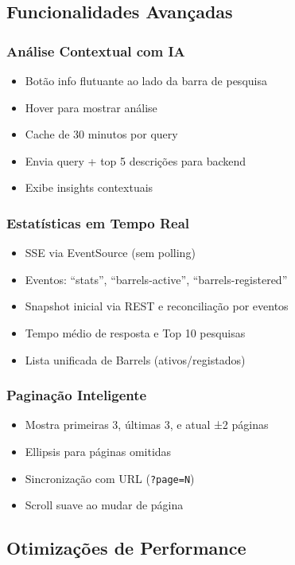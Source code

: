 \documentclass[12pt,a4paper]{article}
\begin{document}
\subsection{Funcionalidades Avançadas}

\subsubsection{Análise Contextual com IA}
\begin{itemize}
    \item Botão info flutuante ao lado da barra de pesquisa
    \item Hover para mostrar análise
    \item Cache de 30 minutos por query
    \item Envia query + top 5 descrições para backend
    \item Exibe insights contextuais
\end{itemize}

\subsubsection{Estatísticas em Tempo Real}
\begin{itemize}
    \item SSE via EventSource (sem polling)
    \item Eventos: ``stats'', ``barrels-active'', ``barrels-registered''
    \item Snapshot inicial via REST e reconciliação por eventos
    \item Tempo médio de resposta e Top 10 pesquisas
    \item Lista unificada de Barrels (ativos/registados)
\end{itemize}

\subsubsection{Paginação Inteligente}
\begin{itemize}
    \item Mostra primeiras 3, últimas 3, e atual ±2 páginas
    \item Ellipsis para páginas omitidas
    \item Sincronização com URL (\texttt{?page=N})
    \item Scroll suave ao mudar de página
\end{itemize}

\subsection{Otimizações de Performance}
\end{document}
